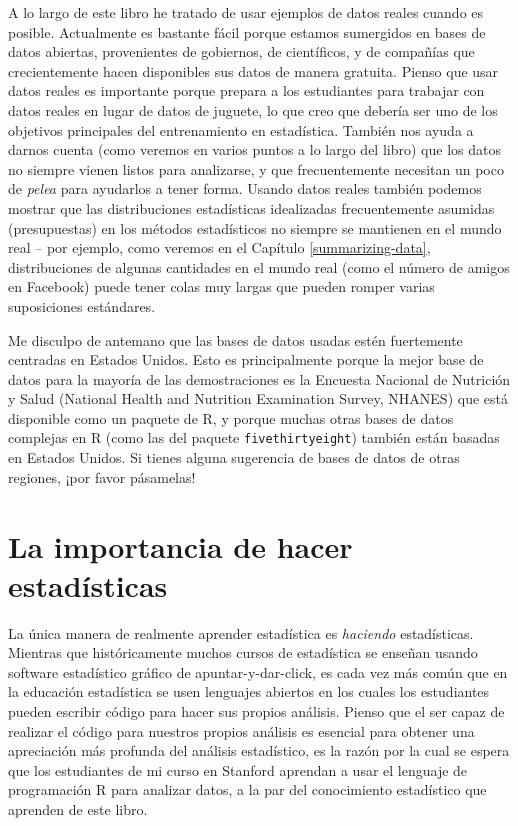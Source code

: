 \documentclass[
  12pt,
]{book}
\begin{document}
A lo largo de este libro he tratado de usar ejemplos de datos reales cuando es posible. Actualmente es bastante fácil porque estamos sumergidos en bases de datos abiertas, provenientes de gobiernos, de científicos, y de compañías que crecientemente hacen disponibles sus datos de manera gratuita. Pienso que usar datos reales es importante porque prepara a los estudiantes para trabajar con datos reales en lugar de datos de juguete, lo que creo que debería ser uno de los objetivos principales del entrenamiento en estadística. También nos ayuda a darnos cuenta (como veremos en varios puntos a lo largo del libro) que los datos no siempre vienen listos para analizarse, y que frecuentemente necesitan un poco de \emph{pelea} para ayudarlos a tener forma. Usando datos reales también podemos mostrar que las distribuciones estadísticas idealizadas frecuentemente asumidas (presupuestas) en los métodos estadísticos no siempre se mantienen en el mundo real -- por ejemplo, como veremos en el Capítulo \ref{summarizing-data}, distribuciones de algunas cantidades en el mundo real (como el número de amigos en Facebook) puede tener colas muy largas que pueden romper varias suposiciones estándares.

Me disculpo de antemano que las bases de datos usadas estén fuertemente centradas en Estados Unidos. Esto es principalmente porque la mejor base de datos para la mayoría de las demostraciones es la Encuesta Nacional de Nutrición y Salud (National Health and Nutrition Examination Survey, NHANES) que está disponible como un paquete de R, y porque muchas otras bases de datos complejas en R (como las del paquete \texttt{fivethirtyeight}) también están basadas en Estados Unidos. Si tienes alguna sugerencia de bases de datos de otras regiones, ¡por favor pásamelas!

\hypertarget{la-importancia-de-hacer-estaduxedsticas}{%
\section{La importancia de hacer estadísticas}\label{la-importancia-de-hacer-estaduxedsticas}}

La única manera de realmente aprender estadística es \emph{haciendo} estadísticas. Mientras que históricamente muchos cursos de estadística se enseñan usando software estadístico gráfico de apuntar-y-dar-click, es cada vez más común que en la educación estadística se usen lenguajes abiertos en los cuales los estudiantes pueden escribir código para hacer sus propios análisis. Pienso que el ser capaz de realizar el código para nuestros propios análisis es esencial para obtener una apreciación más profunda del análisis estadístico, es la razón por la cual se espera que los estudiantes de mi curso en Stanford aprendan a usar el lenguaje de programación R para analizar datos, a la par del conocimiento estadístico que aprenden de este libro.
\end{document}
